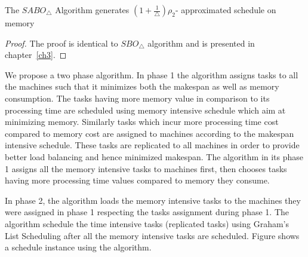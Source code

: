    \begin{theorem} \label{th:chapter5-2b}
     The $SABO_\triangle$ Algorithm generates $ (1+\frac{1}{\triangle})\rho_2 $- approximated schedule on memory 
      \end{theorem}                      
      \begin{proof}  
      The proof is identical to $SBO_\triangle$ algorithm and is presented in chapter~\ref{ch3}.                                           
      \end{proof}    
 
 We propose a two phase algorithm. In phase 1 the algorithm assigns tasks to all the machines such that it minimizes both the makespan as well as memory consumption. The tasks having more memory value  in comparison to its processing time are scheduled using memory intensive schedule which aim at minimizing memory.  Similarly tasks which incur more processing time cost compared to memory cost are assigned to machines according to the makespan intensive schedule. These   tasks are replicated to all machines in order to provide better load balancing and hence minimized makespan. The algorithm in its phase 1 assigns all the memory intensive tasks to machines first, then chooses tasks having more processing time values compared to memory they consume.
 
 In phase 2, the algorithm loads the memory intensive  tasks to the machines they were assigned in phase 1 respecting the tasks assignment during phase 1. The algorithm schedule the time intensive tasks (replicated tasks) using Graham's List Scheduling after all the memory intensive tasks are scheduled. Figure shows a schedule instance using the algorithm.\\
 
